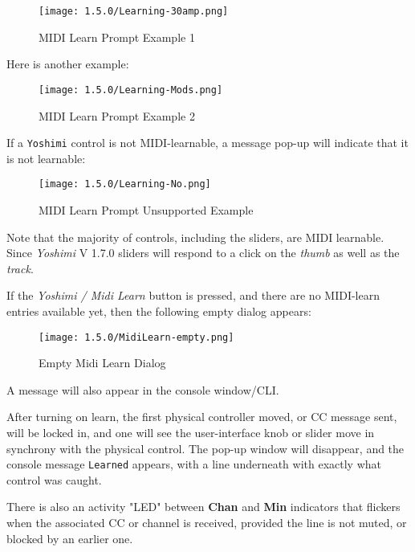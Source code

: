 \begin{figure}[H]
   \centering
   \texttt{[image: 1.5.0/Learning-30amp.png]}
   \caption{MIDI Learn Prompt Example 1}
   \label{fig:midi_learn_ex_1}
\end{figure}

   Here is another example:

\begin{figure}[H]
   \centering
   \texttt{[image: 1.5.0/Learning-Mods.png]}
   \caption{MIDI Learn Prompt Example 2}
   \label{fig:midi_learn_ex_2}
\end{figure}

   If a \texttt{Yoshimi} control is not MIDI-learnable, a message pop-up
   will indicate that it is not
   learnable:

\begin{figure}[H]
   \centering
   \texttt{[image: 1.5.0/Learning-No.png]}
   \caption{MIDI Learn Prompt Unsupported Example}
   \label{fig:midi_learn_unsupported}
\end{figure}

   Note that the majority of controls, including the sliders, are MIDI
   learnable.  Since \textsl{Yoshimi} V 1.7.0 sliders will respond to a
   click on the \textsl{thumb} as well as the \textsl{track}.

   If the \textsl{Yoshimi / Midi Learn} button is pressed, and there are no
   MIDI-learn entries available yet, then the following empty dialog appears:

\begin{figure}[H]
   \centering
   \texttt{[image: 1.5.0/MidiLearn-empty.png]}
   \caption{Empty Midi Learn Dialog}
   \label{fig:empty_midi_learn_dialog}
\end{figure}

   A message will also appear in the console window/CLI.

   After turning on learn, the first physical controller moved, or CC message
   sent, will be locked in, and one will see the user-interface knob or slider
   move in synchrony with the physical control. The pop-up window will
   disappear, and the console message \texttt{Learned} appears, with a line
   underneath with exactly what control was caught.

   There is also an activity "LED" between \textbf{Chan} and
   \textbf{Min} indicators that flickers when the associated CC or channel
   is received, provided the line is not muted, or blocked by an earlier one.

